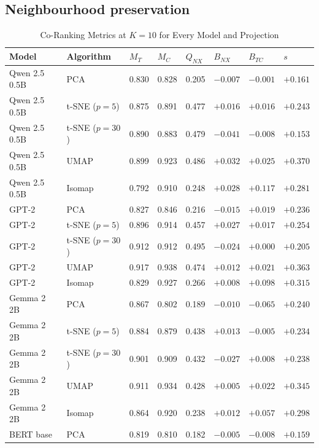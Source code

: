 \documentclass[conference,a4paper]{IEEEtran}
\begin{document}
\subsection{Neighbourhood preservation}\label{sec:neighbourhood-preservation}

\begin{table}[tp]
\centering
\caption{Co-Ranking Metrics at $K = 10$ for Every Model and Projection}\label{tab:main}
\footnotesize
\begin{tabular*}{\textwidth}{@{\extracolsep{\fill}}llllllll@{}}
\toprule
Model & Algorithm & $M_T$ & $M_C$ & $Q_{NX}$ & $B_{NX}$ & $B_{TC}$ & $s$ \\
\midrule
Qwen 2.5 0.5B & PCA & 0.830 & 0.828 & 0.205 & $-0.007$ & $-0.001$ & $+0.161$ \\
Qwen 2.5 0.5B & t-SNE ($p=5$) & 0.875 & 0.891 & 0.477 & $+0.016$ & $+0.016$ & $+0.243$ \\
Qwen 2.5 0.5B & t-SNE ($p=30$) & 0.890 & 0.883 & 0.479 & $-0.041$ & $-0.008$ & $+0.153$ \\
Qwen 2.5 0.5B & UMAP & 0.899 & 0.923 & 0.486 & $+0.032$ & $+0.025$ & $+0.370$ \\
Qwen 2.5 0.5B & Isomap & 0.792 & 0.910 & 0.248 & $+0.028$ & $+0.117$ & $+0.281$ \\
GPT-2 & PCA & 0.827 & 0.846 & 0.216 & $-0.015$ & $+0.019$ & $+0.236$ \\
GPT-2 & t-SNE ($p=5$) & 0.896 & 0.914 & 0.457 & $+0.027$ & $+0.017$ & $+0.254$ \\
GPT-2 & t-SNE ($p=30$) & 0.912 & 0.912 & 0.495 & $-0.024$ & $+0.000$ & $+0.205$ \\
GPT-2 & UMAP & 0.917 & 0.938 & 0.474 & $+0.012$ & $+0.021$ & $+0.363$ \\
GPT-2 & Isomap & 0.829 & 0.927 & 0.266 & $+0.008$ & $+0.098$ & $+0.315$ \\
Gemma 2 2B & PCA & 0.867 & 0.802 & 0.189 & $-0.010$ & $-0.065$ & $+0.240$ \\
Gemma 2 2B & t-SNE ($p=5$) & 0.884 & 0.879 & 0.438 & $+0.013$ & $-0.005$ & $+0.234$ \\
Gemma 2 2B & t-SNE ($p=30$) & 0.901 & 0.909 & 0.432 & $-0.027$ & $+0.008$ & $+0.238$ \\
Gemma 2 2B & UMAP & 0.911 & 0.934 & 0.428 & $+0.005$ & $+0.022$ & $+0.345$ \\
Gemma 2 2B & Isomap & 0.864 & 0.920 & 0.238 & $+0.012$ & $+0.057$ & $+0.298$ \\
BERT base & PCA & 0.819 & 0.810 & 0.182 & $-0.005$ & $-0.008$ & $+0.159$ \\

\end{tabular*}
\end{table}
\end{document}
